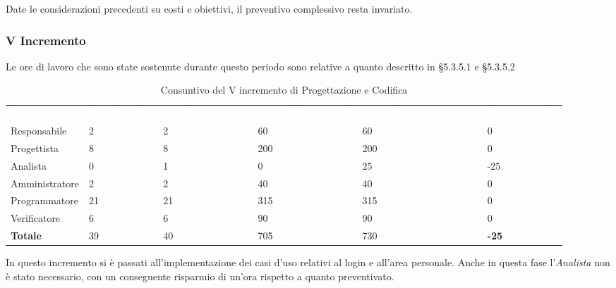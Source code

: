Date le considerazioni precedenti su costi e obiettivi, il preventivo complessivo resta invariato.


\pagebreak


\subsubsection{V Incremento}
Le ore di lavoro che sono state sostenute durante questo periodo sono relative a quanto descritto in §5.3.5.1 e §5.3.5.2

\begin{table}[H]
\begin{center}
\renewcommand{\arraystretch}{1.5}
\begin{tabular}{ m{}<{\centering}  m{}<{\centering} m{}<{\centering} m{}<{\centering} m{}<{\centering} m{}<{\centering}}
	\rowcolor{darkblue}
	\textcolor{white}{\textbf{Ruolo}} & \textcolor{white}{\textbf{Ore Effettive}} & \textcolor{white}{\textbf{Ore Preventivate}}&\textcolor{white}{\textbf{Costo Effettivo (\euro)}}&\textcolor{white}{\textbf{Costo Preventivato (\euro)}}&\textcolor{white}{\textbf{Differenza (\euro)}}\\ 

	Responsabile  & 2 & 2 & 60 & 60 & 0\\	
	
	Progettista & 8 & 8 & 200 & 200 & 0\\
	
	Analista & 0 & 1 & 0 & 25 & -25\\
	
	Amministratore & 2 & 2 & 40 & 40 & 0\\
	
	Programmatore & 21 & 21 & 315 & 315 & 0\\
	
	Verificatore & 6 & 6 & 90 & 90 & 0\\
	
	\textbf{Totale} & 39 & 40 & 705 & 730 & \textbf{-25} \\
	
\end{tabular}
\caption{Consuntivo del V incremento di Progettazione e Codifica}
\end{center}
\end{table}

In questo incremento si è passati all'implementazione dei casi d'uso relativi al login e all'area personale. Anche in questa fase l'\textit{Analista} non è stato necessario, con un conseguente risparmio di un'ora rispetto a quanto preventivato. 

